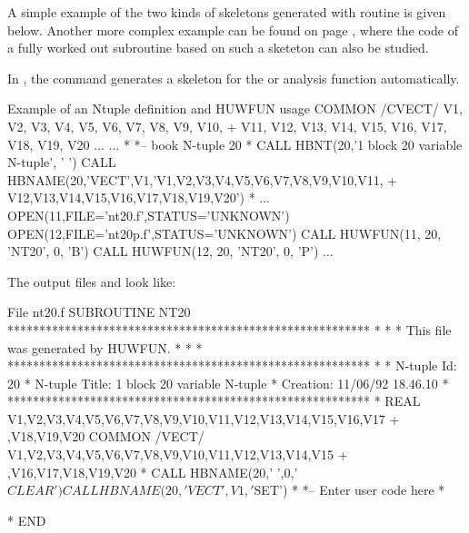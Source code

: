 A simple example of the two kinds of skeletons generated with
routine  is given below.
Another more complex example can be found on page \pageref{sec:staffskeleton},
where the code of a fully worked out subroutine based on such
a sketeton can also be studied.

In \PAW{}, the command  generates a skeleton for the
\RWN{} or \CWN{} analysis function automatically.


\begin{XMPt}{Example of an Ntuple definition and HUWFUN usage}
      COMMON /CVECT/ V1, V2, V3, V4, V5, V6, V7, V8, V9, V10,
     +               V11, V12, V13, V14, V15, V16, V17, V18, V19, V20
      ...
      ...
*
*-- book N-tuple 20
*
      CALL HBNT(20,'1 block 20 variable N-tuple', ' ')
      CALL HBNAME(20,'VECT',V1,'V1,V2,V3,V4,V5,V6,V7,V8,V9,V10,V11,
     +                          V12,V13,V14,V15,V16,V17,V18,V19,V20')
*
      ...
      OPEN(11,FILE='nt20.f',STATUS='UNKNOWN')
      OPEN(12,FILE='nt20p.f',STATUS='UNKNOWN')
      CALL HUWFUN(11, 20, 'NT20', 0, 'B')
      CALL HUWFUN(12, 20, 'NT20', 0, 'P')
      ...
\end{XMPt}
The  output files  and  look like:
\begin{XMPt}{File nt20.f}
      SUBROUTINE NT20
*********************************************************
*                                                       *
* This file was generated by HUWFUN.                    *
*                                                       *
*********************************************************
*
*     N-tuple Id:     20
*     N-tuple Title:  1 block 20 variable N-tuple
*     Creation:       11/06/92 18.46.10
*
*********************************************************
*
      REAL V1,V2,V3,V4,V5,V6,V7,V8,V9,V10,V11,V12,V13,V14,V15,V16,V17
     + ,V18,V19,V20
      COMMON /VECT/ V1,V2,V3,V4,V5,V6,V7,V8,V9,V10,V11,V12,V13,V14,V15
     + ,V16,V17,V18,V19,V20
*
      CALL HBNAME(20,' ',0,'$CLEAR')
      CALL HBNAME(20,'VECT',V1,'$SET')
*
*--   Enter user code here
*

*
      END
\end{XMPt}

\finalnewpage%

